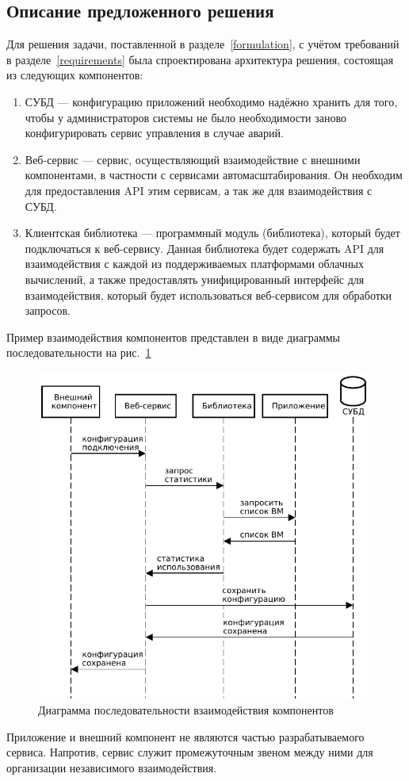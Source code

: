 \subsection{Описание предложенного решения}
Для решения задачи, поставленной в разделе~\ref{formulation}, с учётом требований в разделе~\ref{requirements} была спроектирована архитектура решения, состоящая из следующих компонентов:
\begin{enumerate}
    \item СУБД --- конфигурацию приложений необходимо надёжно хранить для того, чтобы у администраторов системы не было необходимости заново конфигурировать сервис управления в случае аварий.
    \item Веб-сервис --- сервис, осуществляющий взаимодействие с внешними компонентами, в частности с сервисами автомасштабирования. 
    Он необходим для предоставления API этим сервисам, а так же для взаимодействия с СУБД.
    \item Клиентская библиотека --- программный модуль (библиотека), который будет подключаться к веб-сервису.
    Данная библиотека будет содержать API для взаимодействия с каждой из поддерживаемых платформами облачных вычислений, а также предоставлять унифицированный интерфейс для взаимодействия, который будет использоваться веб-сервисом для обработки запросов.
\end{enumerate}

Пример взаимодействия компонентов представлен в виде диаграммы последовательности на рис.~\ref{architecture-sequence}
\begin{figure}[hbtp]
    \centering
    \includegraphics[width=13cm]{img/architecture-sequence.pdf}
    \caption{Диаграмма последовательности взаимодействия компонентов}
    \label{architecture-sequence}
\end{figure}

Приложение и внешний компонент не являются частью разрабатываемого сервиса.
Напротив, сервис служит промежуточным звеном между ними для организации независимого взаимодействия.

\FloatBarrier